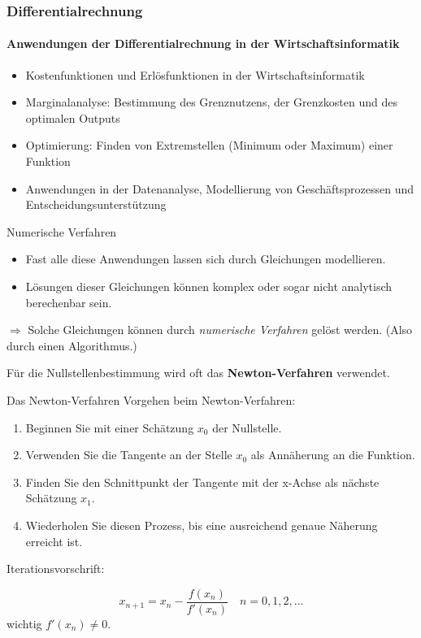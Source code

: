\documentclass{beamer}
\begin{document}
\begin{frame}
  \frametitle{Differentialrechnung}
  \framesubtitle{Anwendungen der Differentialrechnung in der Wirtschaftsinformatik}

  \begin{itemize}
    \item Kostenfunktionen und Erlösfunktionen in der Wirtschaftsinformatik
    \item Marginalanalyse: Bestimmung des Grenznutzens, der Grenzkosten und des optimalen Outputs
    \item Optimierung: Finden von Extremstellen (Minimum oder Maximum) einer Funktion
    \item Anwendungen in der Datenanalyse, Modellierung von Geschäftsprozessen und Entscheidungsunterstützung
  \end{itemize}
\end{frame}


\begin{frame}{Numerische Verfahren}
    \begin{itemize}
    \item Fast alle diese Anwendungen lassen sich durch Gleichungen modellieren.
    \item Lösungen dieser Gleichungen können komplex oder sogar nicht analytisch berechenbar sein.
  \end{itemize}

  $\Longrightarrow$ Solche Gleichungen können durch \textit{numerische Verfahren} gelöst werden. (Also durch einen Algorithmus.)

  \vspace*{1em}

  Für die Nullstellenbestimmung wird oft das \textbf{Newton-Verfahren} verwendet.
\end{frame}

\begin{frame}{Das Newton-Verfahren}
  Vorgehen beim Newton-Verfahren:

  \begin{enumerate}
    \item Beginnen Sie mit einer Schätzung $x_0$ der Nullstelle.
    \item Verwenden Sie die Tangente an der Stelle $x_0$ als Annäherung an die Funktion.
    \item Finden Sie den Schnittpunkt der Tangente mit der x-Achse als nächste Schätzung $x_1$.
    \item Wiederholen Sie diesen Prozess, bis eine ausreichend genaue Näherung erreicht ist.
  \end{enumerate}

  Iterationsvorschrift:

  $$
    x_{n+1} = x_n - \frac{f(x_n)}{f'(x_n)} \quad n = 0,1,2,...
  $$
  wichtig $f'(x_n)\neq 0$.
\end{frame}
\end{document}
